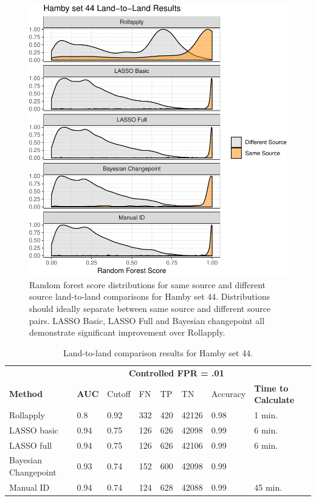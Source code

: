 \documentclass[12pt]{article}
\begin{document}
\begin{figure}
\centering
\includegraphics{writeup_files/figure-latex/hamby-groove-results-1.pdf}
\caption{\label{hamby-groove-results}Random forest score distributions
for same source and different source land-to-land comparisons for Hamby
set 44. Distributions should ideally separate between same source and
different source pairs. LASSO Basic, LASSO Full and Bayesian changepoint
all demonstrate significant improvement over Rollapply.}
\end{figure}

\begin{table}[]
\centering
\begin{tabular}{llllllll}
& & \multicolumn{5}{c}{\textbf{Controlled FPR = .01}} & \\
\textbf{Method} & \textbf{AUC} & Cutoff & FN &TP & TN & Accuracy & \textbf{Time to Calculate} \\ \hline
Rollapply & 0.8 &  0.92 & 332 & 420&42126 & 0.98 & 1 min.\\ \hline
LASSO basic & 0.94 &  0.75 &126 & 626&42098 & 0.99 & 6 min. \\ \hline
LASSO full & 0.94 &  0.75 &126 &626 &42106 & 0.99 & 6 min. \\ \hline
Bayesian Changepoint & 0.93 &  0.74 &152 & 600&42098 & 0.99 & \\ \hline
Manual ID & 0.94 & 0.74 & 124& 628&42088 & 0.99 & 45 min. \\ \hline 
\end{tabular}
\caption{Land-to-land comparison results for Hamby set 44.}
\label{hamby-table}
\end{table}
\end{document}
